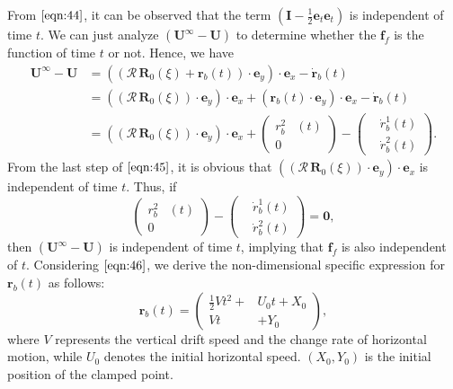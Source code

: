 \documentclass[12pt,MSc,twoside]{muthesis_2020}
\begin{document}
From $\eqref{eqn:44}$, it can be observed that the term $\left(\mathbf{I}-\frac{1}{2}\textbf{e}_t\textbf{e}_t\right)$ is independent of time $t$. We can just analyze $(\textbf{U}^{\infty}-\textbf{U})$ to determine whether the $\textbf{f}_{f}$ is the function of time $t$ or not. Hence, we have 
\begin{equation}
	\label{eqn:45}
	\begin{aligned}
\textbf{U}^{\infty}-\textbf{U}&=\left((\bm{\mathcal{R}}\,\textbf{R}_0(\xi)+\textbf{r}_b(t))\cdot\textbf{e}_y\right)\cdot\textbf{e}_x-\dot{\textbf{r}}_b(t)\\
&=\left((\bm{\mathcal{R}}\,\textbf{R}_0(\xi))\cdot\textbf{e}_y\right)\cdot\textbf{e}_x+(\textbf{r}_b(t)\cdot\textbf{e}_y)\cdot\textbf{e}_x-\dot{\textbf{r}}_b(t)\\
&=\left((\bm{\mathcal{R}}\,\textbf{R}_0(\xi))\cdot\textbf{e}_y\right)\cdot\textbf{e}_x+\left(\begin{aligned}
	r_b^{2}&(t)\\
    0&
\end{aligned}\right)-\left(\begin{aligned}
&\dot{r}_b^{1}(t) \\
&\dot{r}_b^{2}(t)
\end{aligned}\right).
\end{aligned}
\end{equation}
From the last step of $\eqref{eqn:45}$, it is obvious that $\left((\bm{\mathcal{R}}\,\textbf{R}_0(\xi))\cdot\textbf{e}_y\right)\cdot\textbf{e}_x$ is independent of time $t$. Thus, if 
\begin{equation}
	\label{eqn:46}
\left(\begin{aligned}
	r_b^{2}&(t)\\
	0&
\end{aligned}\right)-\left(\begin{aligned}
	&\dot{r}_b^{1}(t) \\
	&\dot{r}_b^{2}(t)
\end{aligned}\right)=\textbf{0},
\end{equation}
then $(\textbf{U}^{\infty}-\textbf{U})$ is independent of time $t$, implying that $\textbf{f}_{f}$ is also independent of $t$.
Considering $\eqref{eqn:46}$, we derive the non-dimensional specific expression for $\textbf{r}_b(t)$ as follows:
\begin{equation}
	\label{eqn:47}
\textbf{r}_b(t)=\left(\begin{aligned}
		\frac{1}{2}V t^2+&U_0t+X_0\\
		Vt&+Y_0
	\end{aligned}\right),
\end{equation}
where $V$ represents the vertical drift speed and the change rate  of horizontal motion, while $U_0$ denotes the initial horizontal speed. $(X_0, Y_0)$ is the initial position of the clamped point.
\end{document}
